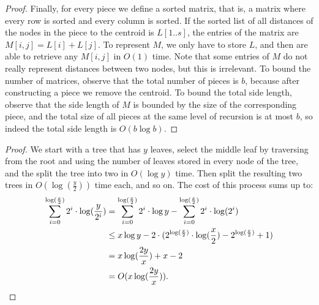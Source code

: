 \documentclass[a4paper,UKenglish]{lipics-v2016}
\theoremstyle{plain}
\begin{document}
\begin{proof}
Finally, for every piece we define a sorted matrix, that is, a matrix where every row is sorted and every column is sorted. If the sorted list of all distances of the nodes in the piece to the
centroid is $L[1..s]$, the entries of the matrix are $M[i,j]=L[i]+L[j]$. To represent $M$, we only have to store $L$, and then are able to
retrieve any $M[i,j]$ in $O(1)$ time. Note that some entries of $M$ do not really represent distances between two nodes, but this is irrelevant.
To bound the number of matrices, observe that the total number of pieces is $b$, because after constructing a piece we remove the centroid.
To bound the total side length, observe that the side length of $M$ is bounded by the size of the corresponding piece, and the total size
of all pieces at the same level of recursion is at most $b$, so indeed the total side length is $O(b\log b)$.
\end{proof}

\runningtimetoobtainsmalltreeslemma*

\begin{proof}
We start with a tree that has $y$ leaves, select the middle leaf by traversing from the root and using the number of leaves stored in every node of the tree, and the split the tree into two in $O(\log y)$ time. Then split the resulting two trees in $O(\log(\frac{y}{2}))$ time each, and so on. The cost of this process sums up to:
\begin{align*}
 \sum_{i=0}^{\log (\frac{x}{2})} 2^i \cdot \log (\frac{y}{2^i}) & = \sum_{i=0}^{\log (\frac{x}{2})} 2^i \cdot \log y - \sum_{i=0}^{\log (\frac{x}{2})} 2^i \cdot \log (2^i)  \\
& \leq x \log y - 2 \cdot (2^{ \log ( \frac{x}{2})} \cdot \log ( \frac{x}{2}) - 2^{ \log ( \frac{x}{2})}+1)  \\
&= x \log (\frac{2y}{x}) + x -2 \\
& = O(x \log (\frac{2y}{x})) .\qedhere
\end{align*}
\end{proof}

\nlognweighted*
\end{document}
